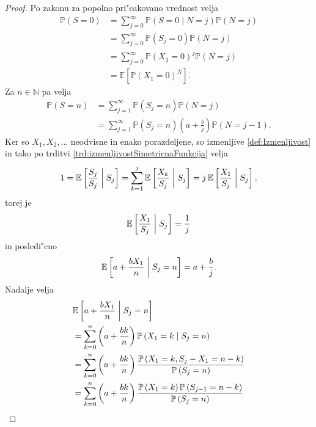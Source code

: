 \documentclass[12pt, a4paper, reqno]{amsart}
\theoremstyle{definition}
\theoremstyle{plain}
\newcommand{\N}{\mathbb{N}}
\newcommand{\E}{\mathbb{E}}
\newcommand{\Prob}{\mathbb{P}}
\newcommand{\1}{\mathds{1}}
\newcommand*{\refPriloga}[1]{%
  \begingroup
    \hypersetup{
      linkcolor=red,
      linkbordercolor=red,
    }%
    \ref{#1}%
  \endgroup
}
\begin{document}
    \begin{proof}
        Po zakonu za popolno pri"cakovano vrednost velja
        \begin{align*}
            \Prob(S = 0) 
                &= \sum_{j = 0}^\infty\Prob\left(S = 0\mid N = j\right)\Prob\left(N = j\right) \\
                &= \sum_{j = 0}^\infty\Prob\left(S_j = 0\right)\Prob\left(N = j\right) \\
                &= \sum_{j = 0}^\infty\Prob\left(X_1 = 0\right)^j\Prob\left(N = j\right) \\
                &= \E\left[\Prob\left(X_1 = 0\right)^N\right].
        \end{align*}
        Za $n\in\N$ pa velja
        \begin{align}
            \Prob(S = n) 
                &= \sum_{j = 1}^\infty\Prob\left(S_j = n\right)\Prob\left(N = j\right) \nonumber \\
                &= \sum_{j = 1}^\infty\Prob\left(S_j = n\right)\left(a + \frac{b}{j}\right)\Prob\left(N = j - 1\right). \label{eq:PanjerRecursionSchemeProof}
        \end{align}
        Ker so $X_1, X_2, \dots$ neodvisne in enako porazdeljene, so izmenljive \refPriloga{def:Izmenljivost} in tako po 
        trditvi \refPriloga{trd:izmenljivostSimetricnaFunkcija} velja
        \begin{equation*}
            1 = \E\left[\frac{S_j}{S_j} \biggm|  S_j\right] = \sum_{k = 1}^j\E\left[\frac{X_k}{S_j} \biggm|  S_j\right] = j\,\E\left[\frac{X_1}{S_j} \biggm|  S_j\right],
        \end{equation*}
        torej je 
        \begin{equation*}
            \E\left[\frac{X_1}{S_j}  \biggm|  S_j\right] = \frac{1}{j}
        \end{equation*}
        in posledi"cno 
        \begin{equation}
            \E\left[a + \frac{bX_1}{n} \biggm|   S_j = n\right] = a + \frac{b}{j}.
            \label{eq:PanjerRecursionSchemeProof2}
        \end{equation}         
        Nadalje velja  
        \begin{align}   
            & \E\left[a + \frac{bX_1}{n} \biggm|   S_j = n\right] \nonumber \\
            &= \sum_{k = 0}^n\left(a + \frac{bk}{n}\right)\Prob\left(X_1 = k\mid S_j = n\right) \nonumber \\
            &= \sum_{k = 0}^n\left(a + \frac{bk}{n}\right)\frac{\Prob\left(X_1 = k, S_j - X_1 = n - k\right)}{\Prob\left(S_j = n\right)} \nonumber \\
            &= \sum_{k = 0}^n\left(a + \frac{bk}{n}\right)\frac{\Prob\left(X_1 = k\right)\Prob\left(S_{j- 1} = n - k\right)}{\Prob\left(S_j = n\right)} \label{eq:PanjerRecursionSchemeProof3} 
        \end{align}


\end{proof}
\end{document}
